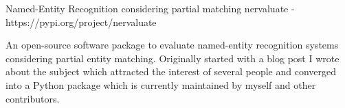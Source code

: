 \begin{cventries}
 \cventry
   {Named-Entity Recognition considering partial matching} %
   {nervaluate - https://pypi.org/project/nervaluate} %
   {} %
   {} %
   {
     \begin{cvitems} %
     	\item {An open-source software package to evaluate named-entity recognition systems considering partial entity matching. Originally started with a blog post I wrote about the subject which attracted the interest of several people and converged into a Python package which is currently maintained by myself and other contributors.}
     \end{cvitems}
   }
\end{cventries}



